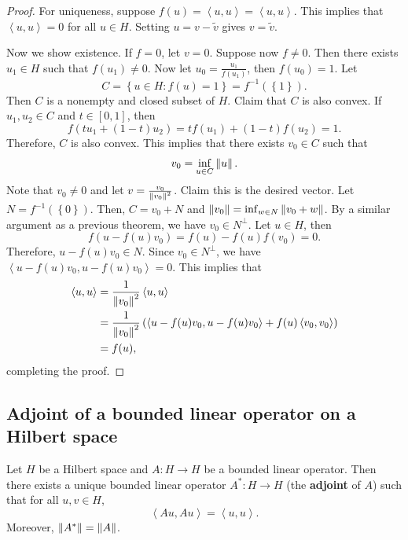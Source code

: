\documentclass[a4paper]{article}
\renewcommand{\braket}[2]{\left\langle #1, #1 \right\rangle}
\begin{document}
\begin{proof}
For uniqueness, suppose $f(u) = \braket{u}{v} 
= \braket{u}{\tilde{v}}$. This implies that 
$\braket{u}{v - \tilde{v}} = 0$ for all $u \in H$.
Setting $u = v - \tilde{v}$ gives $v = \tilde{v}$. 

Now we show existence. If $f = 0$, let $v = 0$.
Suppose now $f \neq 0$. Then there exists 
$u_1 \in H$ such that $f(u_1) \neq 0$. 
Now let $u_0 = \frac{u_1}{f(u_1)}$, then $f(u_0) = 1$. 
Let 
\[
C = \left\{ u \in H: f(u) = 1 \right\} = f^{-1}
(\left\{ 1 \right\}).
\]
Then $C$ is a nonempty and closed subset of $H$. 
Claim that $C$ is also convex. If $u_1, u_2 \in C$ 
and $t \in [0, 1]$, then 
\[
f(t u_1 + (1-t) u_2) = t f(u_1) + (1 - t) f(u_2) = 1.
\]
Therefore, $C$ is also convex. This implies that 
there exists $v_0 \in C$ such that 
\[
v_0 = \inf_{u \in C} \left\lVert u\right\rVert.
\]
Note that $v_0 \neq 0$ and let $v = \frac{v_0}{\left\lVert v_0\right\rVert^2}$.
Claim this is the desired vector. Let $N = f^{-1} 
(\left\{ 0 \right\})$. Then, 
$C = v_0 + N$ and $\left\lVert v_0\right\rVert = \inf_{w \in N} \left\lVert v_0 + w\right\rVert$.
By a similar argument as a previous theorem, 
we have $v_0 \in N^\perp$. Let $u \in H$, then 
\[
f(u - f(u) v_0) = f(u) - f(u) f(v_0) = 0.
\]
Therefore, $u - f(u)v_0 \in N$. Since $v_0 \in N^\perp$,
we have $\braket{u - f(u) v_0}{v_0} = 0$. This implies that
\[
\begin{aligned}
  \braket{u}{v} 
  &= \frac{1}{\norm{v_0}^2} \braket{u}{v_0} \\
  &= \frac{1}{\norm{v_0}^2} \left( \braket{u - f(u)v_0}{v_0} 
  + f(u) \braket{v_0}{v_0} \right) \\
  &= f(u),
\end{aligned}
\]
completing the proof.
\end{proof}

\subsection{Adjoint of a bounded linear operator 
on a Hilbert space}

\begin{thm}
Let $H$ be a Hilbert space and $A : H \to H$ be a bounded 
linear operator. Then there exists a unique bounded linear 
operator $A^* : H \to H$ (the \textbf{adjoint} of $A$) such 
that for all $u, v \in H$, 
\[
\braket{A u}{v} = \braket{u}{A^* v}.
\]
Moreover, $\left\lVert A^*\right\rVert = \left\lVert A\right\rVert$.
\end{thm}
\end{document}
